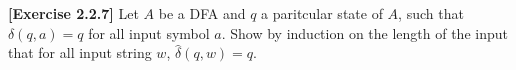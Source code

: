 \textbf{[Exercise 2.2.7]} Let $A$ be a DFA and $q$ a paritcular state of $A$, such that $\delta(q,a)=q$ for all input symbol $a$. 
Show by induction on the length of the input that for all input string $w$, $\hat\delta(q,w)=q$.

